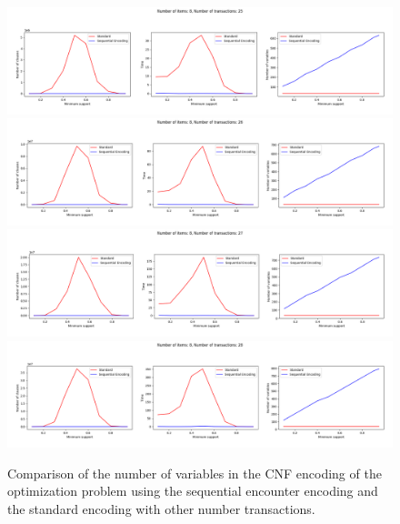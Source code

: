 \begin{figure}[H]
    \centering
    \includegraphics[width=1\textwidth]{chapter4/image/n_trans_25.png}
    \includegraphics[width=1\textwidth]{chapter4/image/n_trans_26.png}
    \includegraphics[width=1\textwidth]{chapter4/image/n_trans_27.png}
    \includegraphics[width=1\textwidth]{chapter4/image/n_trans_28.png}
    \caption{Comparison of the number of variables in the CNF encoding of the optimization problem using the sequential encounter encoding and the standard encoding with other number transactions.}
    \label{fig:4_4}
\end{figure}

